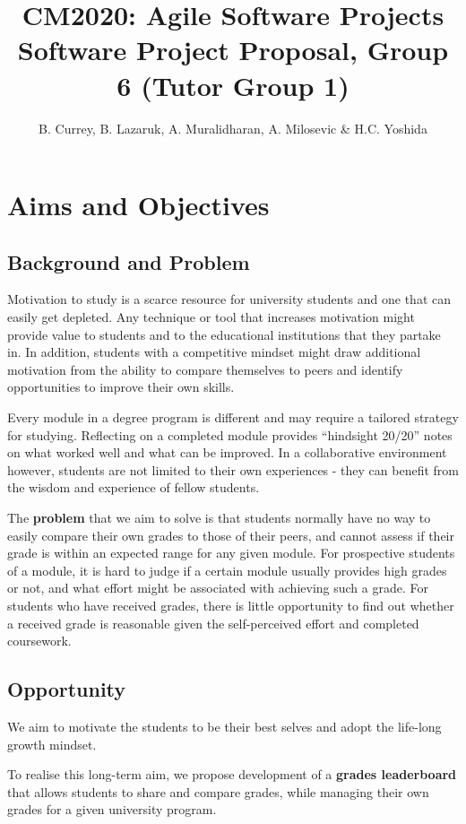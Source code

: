 \title{CM2020: Agile Software Projects \\ Software Project Proposal, Group 6 (Tutor Group 1)}
\author{B. Currey, B. Lazaruk, A. Muralidharan, A. Milosevic \& H.C. Yoshida}




\section{Aims and Objectives}
\subsection{Background and Problem}
Motivation to study is a scarce resource for university students and one that can easily get depleted. Any technique or tool that increases motivation might provide value to students and to the educational institutions that they partake in. In addition, students with a competitive mindset might draw additional motivation from the ability to compare themselves to peers and identify opportunities to improve their own skills.

Every module in a degree program is different and may require a tailored strategy for studying. Reflecting on a completed module provides “hindsight 20/20” notes on what worked well and what can be improved. In a collaborative environment however, students are not limited to their own experiences - they can benefit from the wisdom and experience of fellow students.

The \textbf{problem} that we aim to solve is that students normally have no way to easily compare their own grades to those of their peers, and cannot assess if their grade is within an expected range for any given module. For prospective students of a module, it is hard to judge if a certain module usually provides high grades or not, and what effort might be associated with achieving such a grade. For students who have received grades, there is little opportunity to find out whether a received grade is reasonable given the self-perceived effort and completed coursework.

\subsection{Opportunity}
We aim to motivate the students to be their best selves and adopt the life-long growth mindset.

To realise this long-term aim, we propose development of a \textbf{grades leaderboard} that allows students to share and compare grades, while managing their own grades for a given university program.

